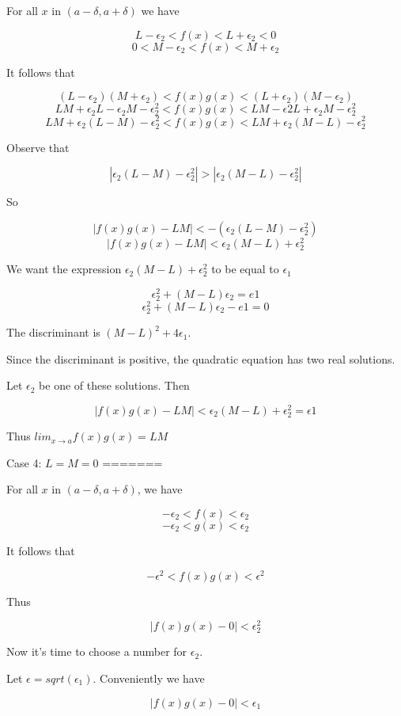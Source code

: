 For all $x$ in $(a - \delta, a + \delta)$ we have

    $$ L - \epsilon_2 < f(x) < L + \epsilon_2 < 0 $$
    $$ 0 < M - \epsilon_2 < f(x) < M + \epsilon_2 $$

It follows that

	$$ (L - \epsilon_2)(M + \epsilon_2) < f(x)g(x) < (L + \epsilon_2)(M - \epsilon_2) $$
	$$ LM + \epsilon_2L - \epsilon_2M - \epsilon_2^2 < f(x)g(x) < LM - \epsilon2L + \epsilon_2M - \epsilon_2^2 $$
	$$ LM + \epsilon_2(L - M) - \epsilon_2^2 < f(x)g(x) < LM + \epsilon_2(M - L) - \epsilon_2^2 $$

Observe that

    $$ |\epsilon_2(L - M) - \epsilon_2^2| > |\epsilon_2(M - L) - \epsilon_2^2| $$

So

    $$ |f(x)g(x) - LM| < -(\epsilon_2(L - M) - \epsilon_2^2) $$
    $$ |f(x)g(x) - LM| < \epsilon_2(M - L) + \epsilon_2^2 $$

We want the expression $\epsilon_2(M - L) + \epsilon_2^2$ to be equal to $\epsilon_1$

    $$ \epsilon_2^2 + (M - L)\epsilon_2 = e1 $$
    $$ \epsilon_2^2 + (M - L)\epsilon_2 - e1 = 0 $$

The discriminant is $(M - L)^2 + 4\epsilon_1$.

Since the discriminant is positive, the quadratic equation has two real solutions.

Let $\epsilon_2$ be one of these solutions. Then

    $$ |f(x)g(x) - LM| < \epsilon_2(M - L) + \epsilon_2^2 = \epsilon1 $$

Thus $lim_{x \rightarrow a} f(x)g(x) = LM$

Case 4: $L = M = 0$
=======

For all $x$ in $(a - \delta, a + \delta)$, we have

    $$ -\epsilon_2 < f(x) < \epsilon_2 $$
    $$ -\epsilon_2 < g(x) < \epsilon_2 $$

It follows that

    $$ -\epsilon^2 < f(x)g(x) < \epsilon^2 $$

Thus

    $$ |f(x)g(x) - 0| < \epsilon_2^2 $$

Now it's time to choose a number for $\epsilon_2$.

Let $\epsilon = sqrt(\epsilon_1)$. Conveniently we have

    $$ |f(x)g(x) - 0| < \epsilon_1 $$

